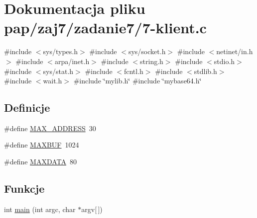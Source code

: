 \hypertarget{7-klient_8c}{}\section{Dokumentacja pliku pap/zaj7/zadanie7/7-\/klient.c}
\label{7-klient_8c}
{\ttfamily \#include $<$sys/types.\+h$>$}\newline
{\ttfamily \#include $<$sys/socket.\+h$>$}\newline
{\ttfamily \#include $<$netinet/in.\+h$>$}\newline
{\ttfamily \#include $<$arpa/inet.\+h$>$}\newline
{\ttfamily \#include $<$string.\+h$>$}\newline
{\ttfamily \#include $<$stdio.\+h$>$}\newline
{\ttfamily \#include $<$sys/stat.\+h$>$}\newline
{\ttfamily \#include $<$fcntl.\+h$>$}\newline
{\ttfamily \#include $<$stdlib.\+h$>$}\newline
{\ttfamily \#include $<$wait.\+h$>$}\newline
{\ttfamily \#include \char`\"{}mylib.\+h\char`\"{}}\newline
{\ttfamily \#include \char`\"{}mybase64.\+h\char`\"{}}\newline
\subsection*{Definicje}
\begin{DoxyCompactItemize}
\item 
\#define \mbox{\hyperlink{7-klient_8c_aaba07841c3e227bc8bdd8ccdad149349}{M\+A\+X\+\_\+\+A\+D\+D\+R\+E\+SS}}~30
\item 
\#define \mbox{\hyperlink{7-klient_8c_ad7871643c05865c80f5d8050aead2b57}{M\+A\+X\+B\+UF}}~1024
\item 
\#define \mbox{\hyperlink{7-klient_8c_ae7e715c270481406658bbd2bafa2897f}{M\+A\+X\+D\+A\+TA}}~80
\end{DoxyCompactItemize}
\subsection*{Funkcje}
\begin{DoxyCompactItemize}
\item 
int \mbox{\hyperlink{7-klient_8c_a0ddf1224851353fc92bfbff6f499fa97}{main}} (int argc, char $\ast$argv\mbox{[}$\,$\mbox{]})
\end{DoxyCompactItemize}


